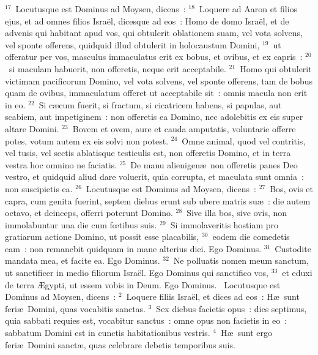 ${}^{17}$~Locutusque est Dominus ad Moysen, dicens~:
${}^{18}$~Loquere ad Aaron et filios ejus, et ad omnes filios Isra\"el, dicesque ad eos~: Homo de domo Isra\"el, et de advenis qui habitant apud vos, qui obtulerit oblationem suam, vel vota solvens, vel sponte offerens, quidquid illud obtulerit in holocaustum Domini,
${}^{19}$~ut offeratur per vos, masculus immaculatus erit ex bobus, et ovibus, et ex capris~:
${}^{20}$~si maculam habuerit, non offeretis, neque erit acceptabile.
${}^{21}$~Homo qui obtulerit victimam pacificorum Domino, vel vota solvens, vel sponte offerens, tam de bobus quam de ovibus, immaculatum offeret ut acceptabile sit~: omnis macula non erit in eo.
${}^{22}$~Si c\ae cum fuerit, si fractum, si cicatricem habens, si papulas, aut scabiem, aut impetiginem~: non offeretis ea Domino, nec adolebitis ex eis super altare Domini.
${}^{23}$~Bovem et ovem, aure et cauda amputatis, voluntarie offerre potes, votum autem ex eis solvi non potest.
${}^{24}$~Omne animal, quod vel contritis, vel tusis, vel sectis ablatisque testiculis est, non offeretis Domino, et in terra vestra hoc omnino ne faciatis.
${}^{25}$~De manu alienigen\ae\ non offeretis panes Deo vestro, et quidquid aliud dare voluerit, quia corrupta, et maculata sunt omnia~: non suscipietis ea.
${}^{26}$~Locutusque est Dominus ad Moysen, dicens~:
${}^{27}$~Bos, ovis et capra, cum genita fuerint, septem diebus erunt sub ubere matris su\ae~: die autem octavo, et deinceps, offerri poterunt Domino.
${}^{28}$~Sive illa bos, sive ovis, non immolabuntur una die cum fœtibus suis.
${}^{29}$~Si immolaveritis hostiam pro gratiarum actione Domino, ut possit esse placabilis,
${}^{30}$~eodem die comedetis eam~: non remanebit quidquam in mane alterius diei. Ego Dominus.
${}^{31}$~Custodite mandata mea, et facite ea. Ego Dominus.
${}^{32}$~Ne polluatis nomen meum sanctum, ut sanctificer in medio filiorum Isra\"el. Ego Dominus qui sanctifico vos,
${}^{33}$~et eduxi de terra \AE gypti, ut essem vobis in Deum. Ego Dominus.
~\lettrine[lines=10,image=true,loversize=0.05,lraise=-0.03]{L}{}ocutusque est Dominus ad Moysen, dicens~:
${}^{2}$~Loquere filiis Isra\"el, et dices ad eos~: H\ae\ sunt feri\ae\ Domini, quas vocabitis sanctas.
${}^{3}$~Sex diebus facietis opus~: dies septimus, quia sabbati requies est, vocabitur sanctus~: omne opus non facietis in eo~: sabbatum Domini est in cunctis habitationibus vestris.
${}^{4}$~H\ae\ sunt ergo feri\ae\ Domini sanct\ae , quas celebrare debetis temporibus suis.


